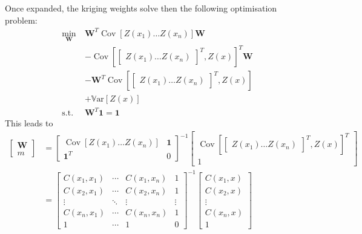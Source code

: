 \documentclass[a4paper,11pt]{article}
\newcommand{\Var}{\mathbb{V}\text{ar}}
\DeclareMathOperator{\Cov}{\mathrm{Cov}}
\theoremstyle{defi}
\numberwithin{thmCounter}{section}
\begin{document}
Once expanded, the kriging weights solve then the following optimisation problem:
\begin{align}
  \min_{\mathbf{W}} ~&\mathbf{W}^T \Cov\left[Z(x_1) \dots Z(x_n)\right] \mathbf{W}\\ &-\Cov\left[
    \begin{bmatrix}
      Z(x_1) \dots Z(x_n)
    \end{bmatrix}^T, Z(x) \right]^T \mathbf{W}\\ &- \mathbf{W}^T\Cov\left[
    \begin{bmatrix}
      Z(x_1) \dots Z(x_n)
    \end{bmatrix}^T, Z(x) \right] \\ &+ \Var\left[Z(x)\right] \\
  \text{s.t.}& \mathbf{W}^T \mathbf{1} = \mathbf{1}
\end{align}
This leads to
\begin{align}
  \begin{bmatrix}
    \mathbf{W} \\ m
  \end{bmatrix}
  &=
  \begin{bmatrix}
    \Cov\left[Z(x_1) \dots Z(x_n)\right] & \mathbf{1} \\
  \mathbf{1}^T & 0
\end{bmatrix}^{-1}
                 \begin{bmatrix}
                  \Cov\left[
    \begin{bmatrix}
      Z(x_1) \dots Z(x_n)
    \end{bmatrix}^T, Z(x) \right]^T \\ 1 
\end{bmatrix}
  \\ &=
    \begin{bmatrix}
      C(x_1, x_1) & \cdots & C(x_1, x_n) & 1 \\
      C(x_2, x_1) & \cdots & C(x_2, x_n) & 1 \\
      \vdots & \ddots & \vdots & \vdots \\
      C(x_n, x_1) & \cdots & C(x_n, x_n)& 1 \\
      1 & \cdots & 1 & 0
    \end{bmatrix}^{-1}
                       \begin{bmatrix}
                         C(x_1, x) \\
                         C(x_2, x) \\
                         \vdots \\
                         C(x_n, x) \\
                         1
                       \end{bmatrix}
\end{align}
\end{document}
